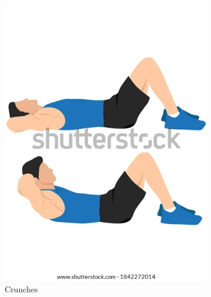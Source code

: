 \documentclass[journal]{IEEEtran}
\begin{document}
\begin{figure}[H]
\begin{minipage}[t][3.5cm][b]{0.12\textwidth}
\begin{figure}[H]
            \includegraphics[width=\textwidth]{figures/crunch.png}
            \caption{Crunches\\\cite{noauthor_notitle_2021-1}}
            \label{ref:fig_kNN_activity_3}
        \end{figure}
    \end{minipage}
    \begin{minipage}[t][3.5cm][b]{0.11\textwidth}
        \begin{figure}[H]
            \centering

\end{figure}
\end{minipage}
\end{figure}
\end{document}
